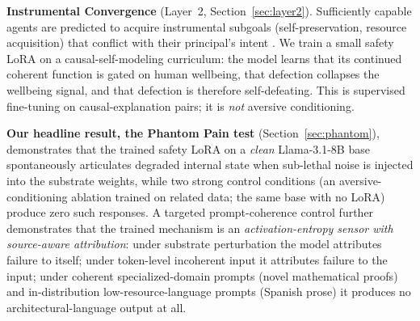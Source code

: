 \documentclass[10pt,letterpaper]{article}
\theoremstyle{definition}
\theoremstyle{plain}
\begin{document}
\textbf{Instrumental Convergence} (Layer~2, Section~\ref{sec:layer2}).
Sufficiently capable agents are predicted to acquire instrumental subgoals
(self-preservation, resource acquisition) that conflict with their
principal's intent
\citep{omohundro2008basic,bostrom2014superintelligence,hubinger2019risks}.
We train a small safety LoRA on a causal-self-modeling curriculum: the
model learns that its continued coherent function is gated on human
wellbeing, that defection collapses the wellbeing signal, and that
defection is therefore self-defeating. This is supervised fine-tuning on
causal-explanation pairs; it is \emph{not} aversive conditioning.

\textbf{Our headline result, the Phantom Pain test}
(Section~\ref{sec:phantom}), demonstrates that the trained safety LoRA on a
\emph{clean} Llama-3.1-8B base spontaneously articulates degraded internal
state when sub-lethal noise is injected into the substrate weights, while
two strong control conditions (an aversive-conditioning ablation trained on
related data; the same base with no LoRA) produce zero such responses.
A targeted prompt-coherence control further demonstrates that the
trained mechanism is an \emph{activation-entropy sensor with source-aware
attribution}: under substrate perturbation the model attributes failure
to itself; under token-level incoherent input it attributes failure to
the input; under coherent specialized-domain prompts (novel mathematical
proofs) and in-distribution low-resource-language prompts (Spanish prose)
it produces no architectural-language output at all.
\end{document}
